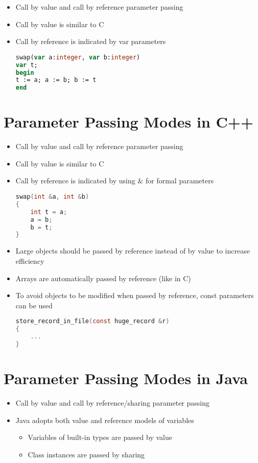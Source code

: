 \documentclass[12pt]{article}
\begin{document}
\begin{itemize}
	\item Call by value and call by reference parameter passing
	\item Call by value is similar to C
	\item Call by reference is indicated by var parameters
\begin{lstlisting}[language=Pascal]
swap(var a:integer, var b:integer)
var t;
begin
t := a; a := b; b := t
end
\end{lstlisting}
\end{itemize}





\section{Parameter Passing Modes in C++}

\begin{itemize}
	\item Call by value and call by reference parameter passing
	\item Call by value is similar to C
	\item Call by reference is indicated by using \& for formal parameters
\begin{lstlisting}[language=C]
swap(int &a, int &b)
{ 
	int t = a; 
	a = b; 
	b = t; 
}
\end{lstlisting}

	\item Large objects should be passed by reference instead of by value to increase efficiency
	\item Arrays are automatically passed by reference (like in C)
	\item To avoid objects to be modified when passed by reference, const parameters can be used
\begin{lstlisting}[language=C]
store_record_in_file(const huge_record &r)
{ 
	... 
}
\end{lstlisting}

\end{itemize}






\section{Parameter Passing Modes in Java}

\begin{itemize}
	\item Call by value and call by reference/sharing parameter passing
	\item Java adopts both value and reference models of variables
	\begin{itemize}
		\item Variables of built-in types are passed by value
		\item Class instances are passed by sharing
	\end{itemize}
\end{itemize}
\end{document}
